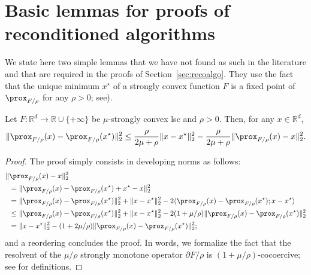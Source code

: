 \section{Basic lemmas for proofs of reconditioned algorithms}


We state here two simple lemmas that we have not found as such in the literature and that are required in the proofs of Section~\ref{sec:recoalgo}. They use the fact that the unique minimum $x^\star$ of a strongly convex function $F$ is a fixed point of $\prox_{F/{\rho }}$ for any $\rho>0$; see\;\cite[Prop.~12.28]{bauschke2011convex}).

\begin{lemma}
    \label{lem:opstrong}
    Let $F: \mathbb{R}^d \to \mathbb{R}\cup\{+\infty\}$ be $\mu$-strongly convex lsc and $\rho>0$.
    Then, %
    for any $x\in\mathbb{R}^d$,
    \begin{align*}
        \| \prox_{F/{\rho}}(x) - \prox_{F/{\rho}}(x^\star) \|^2_2 \leq \frac{{\rho}}{2\mu + {\rho}} \| x - x^\star \|^2_2 - \frac{{\rho}}{2\mu + {\rho}} \| \prox_{F/{\rho}}(x) - x \|^2_2.
    \end{align*}
\end{lemma}
\begin{proof}
    The proof simply consists in developing norms as follows:
    \begin{align*}
        \| &\prox_{F/{\rho}}(x) - x \|^2_2 \\
        &= \| \prox_{F/{\rho}}(x) - \prox_{F/{\rho}}(x^\star) + x^\star - x \|^2_2 \\
        &= \| \prox_{F/{\rho}}(x) - \prox_{F/{\rho}}(x^\star) \|^2_2 + \| x-  x^\star  \|^2_2 - 2 \langle   \prox_{F/{\rho}}(x) - \prox_{F/{\rho}}(x^\star) ; x-  x^\star \rangle  \\
        &\leq  \| \prox_{F/{\rho}}(x) - \prox_{F/{\rho}}(x^\star) \|^2_2 + \| x-  x^\star  \|^2_2 - 2(1+\mu/{\rho}) \| \prox_{F/{\rho}}(x) - \prox_{F/{\rho}}(x^\star) \|^2_2 \\
        &=  \| x-  x^\star  \|^2_2 - ( 1 + 2\mu/{\rho}) \| \prox_{F/{\rho}}(x) - \prox_{F/{\rho}}(x^\star) \|^2_2;
    \end{align*}
    and a reordering concludes the proof. In words, we formalize the fact that the resolvent of the $\mu/{\rho}$ strongly monotone operator $\partial F/{\rho}$ is $(1+\mu/{\rho})$-cocoercive; see\;\cite{bauschke2011convex} for definitions.
\end{proof}

